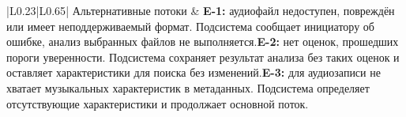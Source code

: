 \begin{longtable}{|L{0.23\textwidth}|L{0.65\textwidth}|}
\hline
Альтернативные потоки & \textbf{E-1:} аудиофайл недоступен, повреждён или имеет неподдерживаемый формат. Подсистема сообщает инициатору об ошибке, анализ выбранных файлов не выполняется.\newline\newline \textbf{E-2:} нет оценок, прошедших пороги уверенности. Подсистема сохраняет результат анализа без таких оценок и оставляет характеристики для поиска без изменений.\newline\newline \textbf{E-3:} для аудиозаписи не хватает музыкальных характеристик в метаданных. Подсистема определяет отсутствующие характеристики и продолжает основной поток. \\
\hline
\end{longtable}
\endgroup

